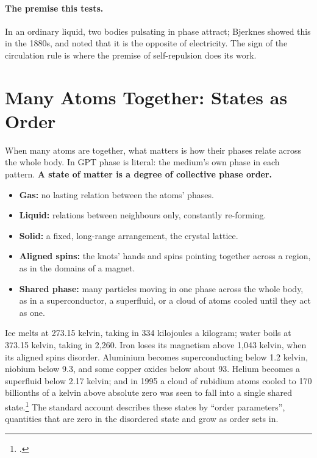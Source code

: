 \documentclass[11pt,a4paper]{article}
\newcommand{\fn}[1]{\footnote{\citealp{#1}.}}
\begin{document}
\paragraph{The premise this tests.} In an ordinary liquid, two bodies pulsating in phase attract; Bjerknes showed this in the 1880s, and noted that it is the opposite of electricity.  The sign of the circulation rule is where the premise of self-repulsion does its work.

\section{Many Atoms Together: States as Order}
\label{sec:states}

\begin{hypbar}
When many atoms are together, what matters is how their phases relate across the whole body. In GPT phase is literal: the medium's own phase in each pattern. \textbf{A state of matter is a degree of collective phase order.}
\begin{itemize}
\item \textbf{Gas:} no lasting relation between the atoms' phases.
\item \textbf{Liquid:} relations between neighbours only, constantly re-forming.
\item \textbf{Solid:} a fixed, long-range arrangement, the crystal lattice.
\item \textbf{Aligned spins:} the knots' hands and spins pointing together across a region, as in the domains of a magnet.
\item \textbf{Shared phase:} many particles moving in one phase across the whole body, as in a superconductor, a superfluid, or a cloud of atoms cooled until they act as one.
\end{itemize}
\end{hypbar}

 Ice melts at 273.15 kelvin, taking in 334 kilojoules a kilogram; water boils at 373.15 kelvin, taking in 2,260. Iron loses its magnetism above 1,043 kelvin, when its aligned spins disorder. Aluminium becomes superconducting below 1.2 kelvin, niobium below 9.3, and some copper oxides below about 93. Helium becomes a superfluid below 2.17 kelvin; and in 1995 a cloud of rubidium atoms cooled to 170 billionths of a kelvin above absolute zero was seen to fall into a single shared state.\fn{anderson1995} The standard account describes these states by ``order parameters'', quantities that are zero in the disordered state and grow as order sets in. 
\end{document}

